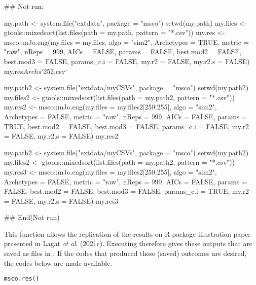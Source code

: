 \documentclass[a4paper]{book}
\begin{document}
\begin{Examples}
\begin{ExampleCode}
## Not run: 

my.path <- system.file("extdata", package = "msco")
setwd(my.path)
my.files <- gtools::mixedsort(list.files(path = my.path, pattern = "*.csv"))
my.res <- msco::mJo.eng(my.files = my.files, algo = "sim2", Archetypes = TRUE,
             metric = "raw", nReps = 999, AICs = FALSE, params = FALSE,
             best.mod2 = FALSE, best.mod3 = FALSE, params_c.i = FALSE,
             my.r2 = FALSE, my.r2.s = FALSE)
my.res$Archs$`252.csv`

my.path2 <- system.file("extdata/myCSVs", package = "msco")
setwd(my.path2)
my.files2 <- gtools::mixedsort(list.files(path = my.path2, pattern = "*.csv"))
my.res2 <- msco::mJo.eng(my.files = my.files2[250:255], algo = "sim2", Archetypes = FALSE,
              metric = "raw", nReps = 999, AICs = FALSE, params = TRUE,
              best.mod2 = FALSE, best.mod3 = FALSE, params_c.i = FALSE,
              my.r2 = FALSE, my.r2.s = FALSE)
my.res2

my.path2 <- system.file("extdata/myCSVs", package = "msco")
setwd(my.path2)
my.files2 <- gtools::mixedsort(list.files(path = my.path2, pattern = "*.csv"))
my.res3 <- msco::mJo.eng(my.files = my.files2[250:255], algo = "sim2", Archetypes = FALSE,
              metric = "raw", nReps = 999, AICs = FALSE, params = FALSE,
              best.mod2 = FALSE, best.mod3 = FALSE, params_c.i = TRUE,
              my.r2 = FALSE, my.r2.s = FALSE)
my.res3
 
## End(Not run)
\end{ExampleCode}
\end{Examples}
%
\begin{Description}\relax
This function allows the replication of the results on  R package illustration paper presented
in Lagat \emph{et al}. (2021c). Executing  therefore gives these outputs that are saved
as  files in . If the codes that produced these (saved) outcomes are desired, the
codes below are made available.
\end{Description}
%
\begin{Usage}
\begin{verbatim}
msco.res()
\end{verbatim}
\end{Usage}
%
\end{document}
